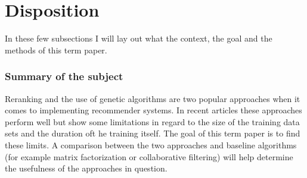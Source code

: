 
\large

\chapter{Disposition}
\label{chp:disposition}

In these few subsections I will lay out what the context, the goal and the methods of this term paper.

\subsection{Summary of the subject}
Reranking and the use of genetic algorithms are two popular approaches when it comes to implementing recommender systems. In recent articles these approaches perform well but show some limitations in regard to the size of the training data sets and the duration oft he training itself. The goal of this term paper is to find these limits. A comparison between the two approaches and baseline algorithms (for example matrix factorization or collaborative filtering) will help determine the usefulness of the approaches in question.

